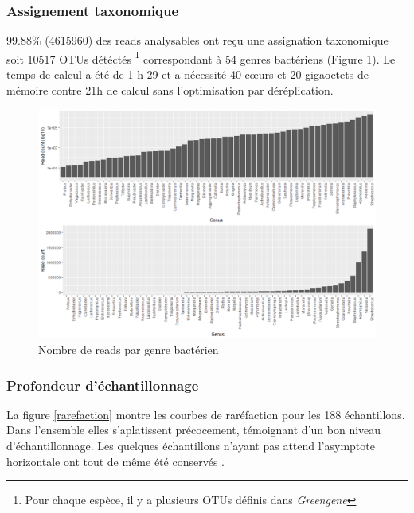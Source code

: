 \documentclass[12pt,a4paper]{article}
\begin{document}
\subsubsection{Assignement taxonomique}
99.88\% (4615960) des reads analysables ont reçu une assignation taxonomique soit 10517 OTUs détéctés \footnote{Pour chaque espèce, il y a plusieurs OTUs définis dans \textit{Greengene}} correspondant à 54 genres bactériens (Figure \ref{readgenus}).
Le temps de calcul a été de 1 h 29 et a nécessité 40 cœurs et 20 gigaoctets de mémoire contre 21h de calcul sans l’optimisation par déréplication.


\begin{figure}[h]
\begin{center}
\includegraphics[scale=0.5]{img/read_count_genus_all.png}\hfill
\end{center}
\caption{Nombre de reads par genre bactérien}
\label{readgenus}
\end{figure}


\subsubsection{Profondeur d’échantillonnage}
La figure \ref{rarefaction} montre les courbes de raréfaction pour les 188 échantillons.
Dans l'ensemble elles s’aplatissent précocement, témoignant d’un bon niveau d'échantillonnage. Les quelques échantillons n'ayant pas attend l'asymptote horizontale ont tout de même été conservés .
\end{document}
